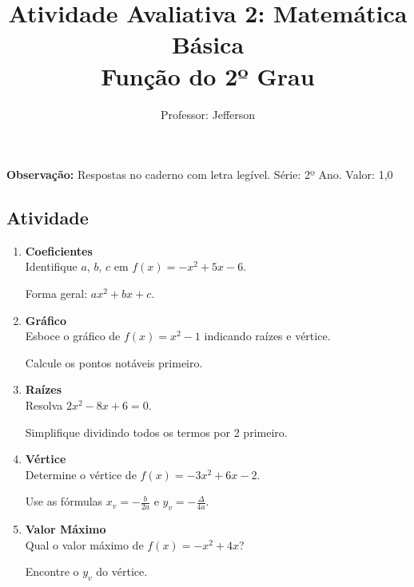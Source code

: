 \documentclass[11pt]{article}
\title{\textcolor{titleblue}{Atividade Avaliativa 2:  Matemática Básica \\ Função do 2º Grau}}
\author{Professor: Jefferson}
\date{}
\begin{document}
\maketitle
\vspace{-1cm}

\begin{center}
    \large{\textbf{Observação:} Respostas no caderno com letra legível. \quad Série: 2º Ano. Valor: 1,0}
\end{center}

\begin{multicols}{2}

\section*{Atividade}
\begin{enumerate}

\item \textbf{Coeficientes}\\
Identifique $a$, $b$, $c$ em $f(x) = -x^2 + 5x - 6$.
\begin{tcolorbox}[colback=explanationbg,colframe=titleblue,title=Dica:]
Forma geral: $ax^2 + bx + c$.
\end{tcolorbox}

\item \textbf{Gráfico}\\
Esboce o gráfico de $f(x) = x^2 - 1$ indicando raízes e vértice.
\begin{tcolorbox}[colback=explanationbg,colframe=titleblue,title=Dica:]
Calcule os pontos notáveis primeiro.
\end{tcolorbox}

\item \textbf{Raízes}\\
Resolva $2x^2 - 8x + 6 = 0$.
\begin{tcolorbox}[colback=explanationbg,colframe=titleblue,title=Dica:]
Simplifique dividindo todos os termos por 2 primeiro.
\end{tcolorbox}

\item \textbf{Vértice}\\
Determine o vértice de $f(x) = -3x^2 + 6x - 2$.
\begin{tcolorbox}[colback=explanationbg,colframe=titleblue,title=Dica:]
    Use as fórmulas $x_v = - \frac{b}{2a}$ e $y_v = - \frac{\Delta}{4a}$.
\end{tcolorbox}

\item \textbf{Valor Máximo}\\
Qual o valor máximo de $f(x) = -x^2 + 4x$?
\begin{tcolorbox}[colback=explanationbg,colframe=titleblue,title=Dica:]
Encontre o $y_v$ do vértice.
\end{tcolorbox}


\end{enumerate}
\end{multicols}
\end{document}
